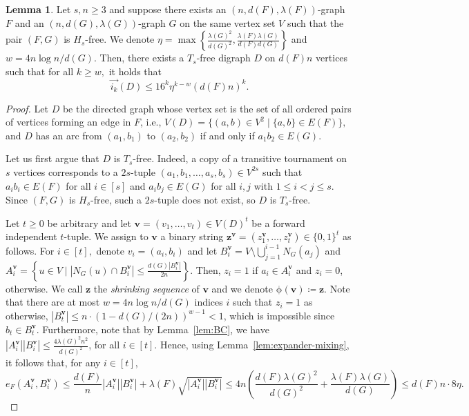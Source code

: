 \documentclass{article}
\theoremstyle{plain}
\newtheorem{theorem}{Theorem}[section]
\newtheorem{lemma}[theorem]{Lemma}
\theoremstyle{definition}
\newtheorem{lemma}{Lemma}
\newcommand{\bz}{\mathbf{z}}
\newcommand{\bv}{\mathbf{v}}
\newcommand{\fwi}[1]{\overrightarrow{i_{#1}}}
\begin{document}
\begin{lemma} \label{lem:FG-gives-digraph}
    Let $s, n \ge 3$ and suppose there exists an $(n, d(F), \lambda(F))$-graph $F$ and an $(n, d(G), \lambda(G))$-graph $G$ on the same vertex set $V$ such that the pair $(F, G)$ is $H_s$-free. We denote $\eta = \max\left\{ \frac{\lambda(G)^2}{d(G)^2}, \frac{\lambda(F) \lambda(G)}{d(F) d(G)} \right\}$ and \linebreak$w = 4n \log n / d(G)$. Then, there exists a $T_s$-free digraph $D$ on $d(F)n$ vertices such that for all $k \ge w,$ it holds that 
    \[ \fwi{k}(D) \le 16^k \eta^{k - w} (d(F) n)^k. \]
\end{lemma}
\begin{proof}
    Let $D$ be the directed graph whose vertex set is the set of all ordered pairs of vertices forming an edge in $F$, i.e., $V(D) = \{ (a, b) \in V^2 \mid \{a,b\} \in E(F)\},$ and $D$ has an arc from $(a_1, b_1)$ to $(a_2, b_2)$ if and only if $a_1b_2 \in E(G)$.
    
    Let us first argue that $D$ is $T_s$-free. Indeed, a copy of a transitive tournament on $s$ vertices corresponds to a $2s$-tuple $(a_1, b_1, \dots, a_s, b_s) \in V^{2s}$ such that $a_i b_i \in E(F)$ for all $i \in [s]$ and $a_i b_j \in E(G)$ for all $i, j$ with $1 \le i < j \le s$. Since $(F,G)$ is $H_s$-free, such a $2s$-tuple does not exist, so $D$ is $T_s$-free.

    Let $t \ge 0$ be arbitrary and let $\bv = (v_1, \dots, v_t) \in V(D)^t$ be a forward independent $t$-tuple. We assign to $\bv$ a binary string $\bz^\bv = (z^\bv_1, \dots, z^\bv_t) \in \{0, 1\}^t$ as follows. For $i \in [t],$ denote $v_i = (a_i, b_i)$ and let $B^\bv_i = V\setminus \bigcup_{j=1}^{i-1} N_G(a_j)$ and $A^\bv_i = \left\{ u \in V \mid |N_G(u) \cap B^\bv_i| \le \frac{d(G) |B^\bv_i|}{2n} \right\}.$ Then, $z_i = 1$ if $a_i \in A^\bv_i$ and $z_i = 0$, otherwise. We call $\bz$ the \emph{shrinking sequence} of $\bv$ and we denote $\mathrm{\phi}(\bv) \coloneqq \bz$. Note that there are at most $w = 4n \log n / d(G)$ indices $i$ such that $z_i = 1$ as otherwise, $|B^\bv_t| \le n \cdot (1 - d(G) / (2n))^{w-1} < 1$, which is impossible since $b_t \in B^\bv_t$. Furthermore, note that by Lemma~\ref{lem:BC}, we have $|A^\bv_i||B^\bv_i| \le \frac{4 \lambda(G)^2 n^2}{d(G)^2}$, for all $i \in [t]$. Hence, using Lemma~\ref{lem:expander-mixing}, it follows that, for any $i \in [t]$,
    \begin{equation} \label{eq:choices-for-nonshrinking}
        e_F(A^\bv_i, B^\bv_i) \le \frac{d(F)}{n} |A^\bv_i||B^\bv_i| + \lambda(F) \sqrt{|A^\bv_i||B^\bv_i|} \le 4n \left( \frac{ d(F) \lambda(G)^2}{d(G)^2} + \frac{\lambda(F) \lambda(G)}{d(G)} \right) \le d(F)n \cdot 8 \eta.
    \end{equation}
        

\end{proof}
\end{document}

